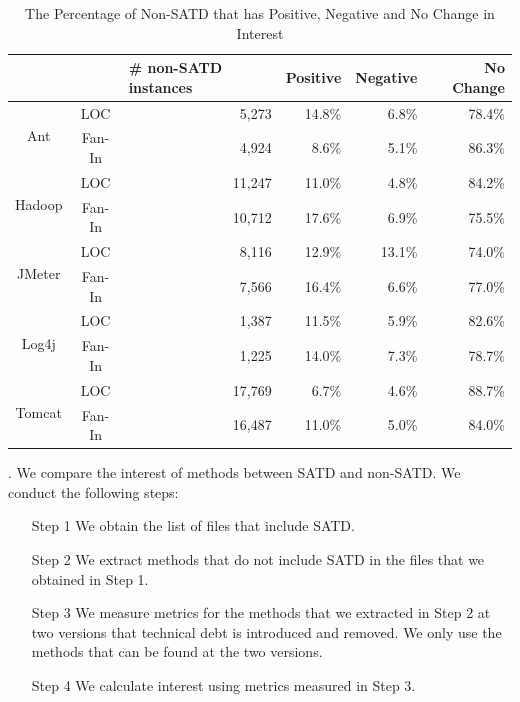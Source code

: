 \documentclass[10pt, conference]{IEEEtran}
\newcommand{\smallsection}[1]{\vspace{1mm}\noindent {\bf #1}.\hspace{2mm}}
\begin{document}
\begin{table}[tb]
  \caption{The Percentage of Non-SATD that has Positive, Negative and No Change in Interest}
  \label{tab:percentage_non-SATD} 
  \centering

  \begin{tabular}{cc|p{0.65in}|rrr}
  \hline
        & & \textbf{\# non-SATD instances} & \textbf{Positive} & \textbf{Negative} & \textbf{No Change} \\
  \hline
\multirow{2}{*}{Ant} &  LOC  & \multicolumn{1}{r|}{5,273} &  14.8\%  &  6.8\% & 78.4\%\\
                   & Fan-In  & \multicolumn{1}{r|}{4,924} &  8.6\%  &  5.1\% & 86.3\%\\
  \hline
\multirow{2}{*}{Hadoop} &  LOC  & \multicolumn{1}{r|}{11,247} &  11.0\%  &  4.8\% & 84.2\%\\
                      & Fan-In  & \multicolumn{1}{r|}{10,712} &  17.6\%  &  6.9\% & 75.5\%\\
  \hline
\multirow{2}{*}{JMeter} &  LOC  & \multicolumn{1}{r|}{8,116} &  12.9\%  &  13.1\% & 74.0\%\\
                      & Fan-In  & \multicolumn{1}{r|}{7,566} &  16.4\%  &  6.6\% & 77.0\%\\
  \hline
\multirow{2}{*}{Log4j} &  LOC  & \multicolumn{1}{r|}{1,387} &  11.5\%  &  5.9\% & 82.6\%\\
                     & Fan-In  & \multicolumn{1}{r|}{1,225} &  14.0\%  &  7.3\% & 78.7\%\\
  \hline
\multirow{2}{*}{Tomcat} &  LOC  & \multicolumn{1}{r|}{17,769} &  6.7\%  &  4.6\% & 88.7\%\\
                      & Fan-In  & \multicolumn{1}{r|}{16,487} &  11.0\%  &  5.0\% & 84.0\%\\
  \hline
  \end{tabular}
\end{table}


\smallsection{Approach}
We compare the interest of methods between SATD and non-SATD.
We conduct the following steps:
\begin{itemize}
\item [Step 1] We obtain the list of files that include SATD. %
\item [Step 2] We extract methods that do not include SATD in the files that we obtained in Step 1. %
\item [Step 3] We measure metrics for the methods that we extracted in Step 2 at two versions that technical debt is introduced and removed. We only use the methods that can be found at the two versions.
\item [Step 4] We calculate interest using metrics measured in Step 3.
\end{itemize}
\end{document}
